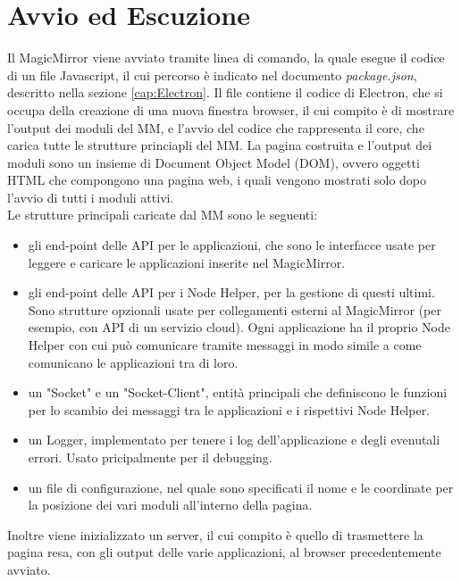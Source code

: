 \section{Avvio ed Escuzione}\label{cap:MMavvio}
Il MagicMirror viene avviato tramite linea di comando, la quale esegue
il codice di un file Javascript, il cui percorso \`e indicato nel documento \textit{package.json}, descritto nella sezione \ref{cap:Electron}.
Il file contiene il codice di Electron, che si occupa della creazione di una nuova finestra browser, il cui compito
\`e di mostrare l'output dei moduli del MM, e l'avvio del codice che rappresenta il core, che carica tutte le strutture princiapli del MM.
La pagina costruita e l'output dei moduli sono un insieme di Document Object Model (DOM), ovvero oggetti HTML che compongono una pagina web, i quali vengono mostrati
solo dopo l'avvio di tutti i moduli attivi.\\
Le strutture principali caricate dal MM sono le seguenti:
\begin{itemize}
\item gli end-point delle API per le applicazioni, che sono le interfacce usate per leggere e caricare le applicazioni inserite nel MagicMirror.
\item gli end-point delle API per i Node Helper, per la gestione di questi ultimi. Sono strutture opzionali usate per collegamenti
esterni al MagicMirror (per esempio, con API di un servizio cloud). Ogni applicazione ha il proprio Node Helper con cui pu\`o comunicare tramite messaggi in modo
simile a come comunicano le applicazioni tra di loro.
\item un "Socket" e un "Socket-Client", entit\`a principali che definiscono le funzioni per lo scambio dei messaggi tra le applicazioni e i rispettivi Node Helper.
\item un Logger, implementato per tenere i log dell'applicazione e degli evenutali errori. Usato pricipalmente per il debugging.
\item un file di configurazione, nel quale sono specificati il nome e le coordinate per la posizione dei vari moduli
all'interno della pagina.\\[2\baselineskip]
\end{itemize}
Inoltre viene inizializzato un server, il cui compito \`e quello di trasmettere la pagina resa, con gli output delle varie applicazioni,
al browser precedentemente avviato.

